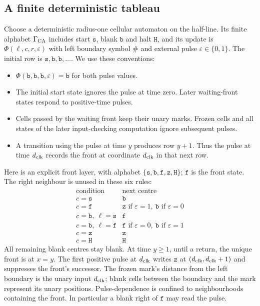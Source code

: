 \subsection{A finite deterministic tableau}\label{sec:tableau}
Choose a deterministic radius-one cellular automaton on the half-line. Its finite alphabet $\Gamma_{\rm CA}$ includes start $\mathtt s$, blank $\mathtt b$ and halt $\mathtt H$, and its update is $\Phi(\ell,c,r,\varepsilon)$ with left boundary symbol $\#$ and external pulse $\varepsilon\in\{0,1\}$. The initial row is $\mathtt s,\mathtt b,\mathtt b,\ldots$. We use these conventions:
\begin{itemize}
\item $\Phi(\mathtt b,\mathtt b,\mathtt b,\varepsilon)=\mathtt b$ for both pulse values.
\item The initial start state ignores the pulse at time zero. Later waiting-front states respond to positive-time pulses.
\item Cells passed by the waiting front keep their unary marks. Frozen cells and all states of the later input-checking computation ignore subsequent pulses.
\item A transition using the pulse at time $y$ produces row $y+1$. Thus the pulse at time ${d_{\rm clk}}$ records the front at coordinate ${d_{\rm clk}}$ in that next row.
\end{itemize}
Here is an explicit front layer, with alphabet $\{\mathtt s,\mathtt b,\mathtt f,\mathtt z,\mathtt H\}$; $\mathtt f$ is the front state. The right neighbour is unused in these six rules:
\[
\begin{array}{c|l}
\text{condition}&\text{next centre}\\\hline
c=\mathtt s&\mathtt b\\
c=\mathtt f&\mathtt z\text{ if }\varepsilon=1,\ \mathtt b\text{ if }\varepsilon=0\\
c=\mathtt b,\ \ell=\mathtt s&\mathtt f\\
c=\mathtt b,\ \ell=\mathtt f&\mathtt f\text{ if }\varepsilon=0,\ \mathtt b\text{ if }\varepsilon=1\\
c=\mathtt z&\mathtt z\\
c=\mathtt H&\mathtt H
\end{array}
\]
All remaining blank centres stay blank. At time $y\geq1$, until a return, the unique front is at $x=y$. The first positive pulse at ${d_{\rm clk}}$ writes $\mathtt z$ at $({d_{\rm clk}},{d_{\rm clk}}+1)$ and suppresses the front's successor. The frozen mark's distance from the left boundary is the unary input ${d_{\rm clk}}$; blank cells between the boundary and the mark represent its unary positions. Pulse-dependence is confined to neighbourhoods containing the front. In particular a blank right of $\mathtt f$ may read the pulse.

